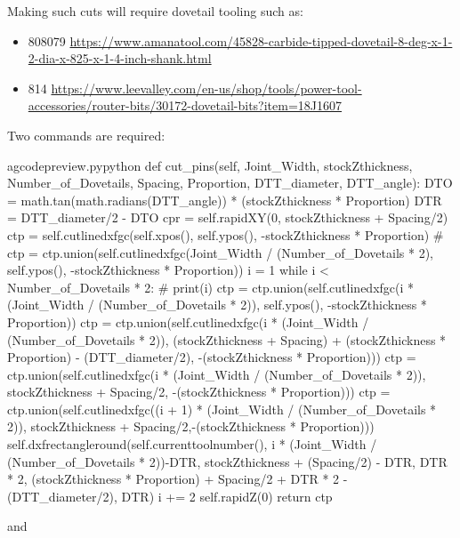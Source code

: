 \documentclass{ltxdoc}
\begin{document}
Making such cuts will require dovetail tooling such as:

\begin{itemize}
\item 808079  \url{https://www.amanatool.com/45828-carbide-tipped-dovetail-8-deg-x-1-2-dia-x-825-x-1-4-inch-shank.html}
\item 814  \url{https://www.leevalley.com/en-us/shop/tools/power-tool-accessories/router-bits/30172-dovetail-bits?item=18J1607}
\end{itemize}

Two commands are required:

\lstset{firstnumber=\thegcpy}
\begin{writecode}{a}{gcodepreview.py}{python}
    def cut_pins(self, Joint_Width, stockZthickness, Number_of_Dovetails, Spacing, Proportion, DTT_diameter, DTT_angle):
        DTO = math.tan(math.radians(DTT_angle)) * (stockZthickness * Proportion)
        DTR = DTT_diameter/2 - DTO
        cpr = self.rapidXY(0, stockZthickness + Spacing/2)
        ctp = self.cutlinedxfgc(self.xpos(), self.ypos(), -stockZthickness * Proportion)
#        ctp = ctp.union(self.cutlinedxfgc(Joint_Width / (Number_of_Dovetails * 2), self.ypos(), -stockZthickness * Proportion))
        i = 1
        while i < Number_of_Dovetails * 2:
#            print(i)
            ctp = ctp.union(self.cutlinedxfgc(i * (Joint_Width / (Number_of_Dovetails * 2)), self.ypos(), -stockZthickness * Proportion))
            ctp = ctp.union(self.cutlinedxfgc(i * (Joint_Width / (Number_of_Dovetails * 2)), (stockZthickness + Spacing) + (stockZthickness * Proportion) - (DTT_diameter/2), -(stockZthickness * Proportion)))
            ctp = ctp.union(self.cutlinedxfgc(i * (Joint_Width / (Number_of_Dovetails * 2)), stockZthickness + Spacing/2, -(stockZthickness * Proportion)))
            ctp = ctp.union(self.cutlinedxfgc((i + 1) * (Joint_Width / (Number_of_Dovetails * 2)), stockZthickness + Spacing/2,-(stockZthickness * Proportion)))
            self.dxfrectangleround(self.currenttoolnumber(), 
                i * (Joint_Width / (Number_of_Dovetails * 2))-DTR, 
                stockZthickness + (Spacing/2) - DTR, 
                DTR * 2,
                (stockZthickness * Proportion) + Spacing/2 + DTR * 2 - (DTT_diameter/2), 
                DTR)
            i += 2
        self.rapidZ(0)
        return ctp
    
\end{writecode}
\addtocounter{gcpy}{23}

\noindent and
\end{document}
